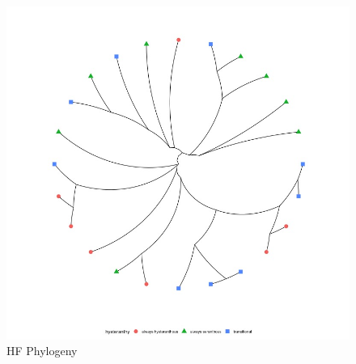 \documentclass[12pt]{article}\usepackage[]{graphicx}\usepackage[]{color}
\begin{document}
    \begin{figure}
    \centering
    \includegraphics[height=.8\textheight]{..//figure/HFtreeplot.jpeg}
    \caption{HF Phylogeny}
    \label{fig:Figure S5}
    \end{figure}
\end{document}

